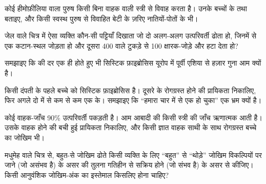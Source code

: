 \begin{exercise}[$\star\star$]\label{exo:g11:genes-and-disease:9}
कोई हीमोफ़ीलिया वाला पुरुष किसी बिना वाहक वाली स्त्री से विवाह करता है।
उनके बच्चों के  तथा  बताइए, और किसी स्वस्थ पुरुष से
विवाहित बेटी के ज़रिए नातियों-पोतों के भी।
\end{exercise}

\begin{exercise}[$\star\star$]\label{exo:g11:genes-and-disease:10}
जेल वाले चित्र में ऐसा व्यक्ति कौन-सी पट्टियाँ दिखाता जो दो अलग-अलग
उत्परिवर्ती  ढोता हो, जिनमें से एक कटान-स्थल जोड़ता हो और दूसरा 400
वाले टुकड़े से 100 क्षारक-जोड़े और हटा देता हो?
\end{exercise}

\begin{exercise}[$\star\star$]\label{exo:g11:genes-and-disease:11}
समझाइए कि  की दर एक ही होते हुए भी सिस्टिक फ़ाइब्रोसिस यूरोप में
पूर्वी एशिया से हज़ार गुना आम क्यों है।
\end{exercise}

\begin{exercise}[$\star\star\star$]\label{exo:g11:genes-and-disease:12}
किसी दंपती के पहले बच्चे को सिस्टिक फ़ाइब्रोसिस है। दूसरे के रोगग्रस्त होने
की प्रायिकता निकालिए, फिर अगले दो में से कम से कम एक के। समझाइए कि
``हमारा चार में से एक हो चुका'' एक भ्रम क्यों है।
\end{exercise}

\begin{exercise}[$\star\star\star$]\label{exo:g11:genes-and-disease:13}
कोई वाहक-जाँच 90\% उत्परिवर्ती  पकड़ती है। आम आबादी की किसी स्त्री
की जाँच ऋणात्मक आती है। उसके वाहक होने की बची हुई प्रायिकता निकालिए, और
किसी ज्ञात वाहक साथी के साथ रोगग्रस्त बच्चे का जोखिम भी।
\end{exercise}

\begin{exercise}[$\star\star\star$]\label{exo:g11:genes-and-disease:14}
मधुमेह वाले चित्र से, बहुत-से जोखिम  ढोते किसी व्यक्ति के लिए
``बहुत'' से ``थोड़े'' जोखिम विकल्पियों पर जाने (जो असंभव है) के असर की
तुलना गतिहीन से सक्रिय होने (जो संभव है) के असर से कीजिए। किसी आनुवंशिक
जोखिम-अंक का इस्तेमाल किसलिए होना चाहिए?
\end{exercise}

